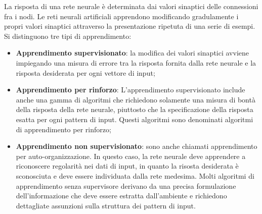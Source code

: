 La risposta di una rete neurale è determinata dai valori sinaptici delle
connessioni fra i nodi. Le reti neurali artificiali apprendono modificando
gradulamente i propri valori sinaptici attraverso la presentazione ripetuta di
una serie di esempi. Si distinguono tre tipi di apprendimento:
\begin{itemize}
	\item \textbf{Apprendimento supervisionato}: la modifica dei valori
	      sinaptici avviene impiegando una misura di errore tra la risposta
	      fornita dalla rete neurale e la risposta desiderata per ogni vettore
	      di input;

	\item \textbf{Apprendimento per rinforzo}: L'apprendimento supervisionato
	      include anche una gamma di algoritmi che richiedono solamente una
	      misura di bontà della risposta della rete neurale, piuttosto che la
	      specificazione della risposta esatta per ogni pattern di input. Questi
	      algoritmi sono denominati algoritmi di apprendimento per rinforzo;

	\item \textbf{Apprendimento non supervisionato}: sono anche chiamati
	      apprendimento per auto-organizzazione. In questo caso, la rete
	      neurale deve apprendere a riconoscere regolarità nei dati di input, in
	      quanto la risosta desiderata è sconosciuta e deve essere individuata
	      dalla rete medesima. Molti algoritmi di apprendimento senza
	      supervisore derivano da una precisa formulazione dell'informazione che
	      deve essere estratta dall'ambiente e richiedono dettagliate assunzioni
	      sulla struttura dei pattern di input.
\end{itemize}

